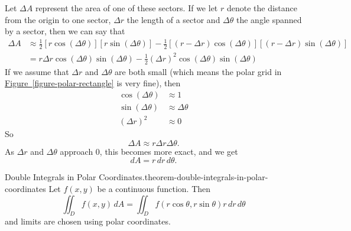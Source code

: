 \documentclass[10pt,]{book}
\numberwithin{equation}{section}
\begin{document}
%
\par
\hypertarget{p-1486}{}%
Let \(\Delta A\) represent the area of one of these sectors. If we let \(r\) denote the distance from the origin to one sector, \(\Delta r\) the length of a sector and \(\Delta\theta\) the angle spanned by a sector, then we can say that%
\begin{align*}
\Delta A & \approx \frac{1}{2}[r\cos(\Delta\theta)][r\sin(\Delta\theta)] - \frac{1}{2}[(r-\Delta r)\cos(\Delta\theta)][(r-\Delta r)\sin(\Delta\theta)] \\
& = r\Delta r\cos(\Delta\theta)\sin(\Delta\theta) - \frac{1}{2}(\Delta r)^{2}\cos(\Delta\theta)\sin(\Delta\theta)
\end{align*}
If we assume that \(\Delta r\) and \(\Delta\theta\) are both small (which means the polar grid in \hyperref[figure-polar-rectangle]{Figure~\ref{figure-polar-rectangle}} is very fine), then%
\begin{align*}
\cos(\Delta\theta) & \approx 1 \\
\sin(\Delta\theta) & \approx \Delta\theta \\
(\Delta r)^{2} & \approx 0 
\end{align*}
So%
\begin{equation*}
\Delta A \approx r\Delta r\Delta\theta\text{.}
\end{equation*}
As \(\Delta r\) and \(\Delta\theta\) approach \(0\), this becomes more exact, and we get%
\begin{equation*}
dA = r\,dr\,d\theta\text{.}
\end{equation*}
%
\begin{theorem}{Double Integrals in Polar Coordinates.}{}{theorem-double-integrals-in-polar-coordinates}%
\hypertarget{p-1487}{}%
Let \(f(x,y)\) be a continuous function. Then%
\begin{equation*}
\iint_{D}f(x,y)\,dA = \iint_{D}f(r\cos\theta,r\sin\theta)r\,dr\,d\theta
\end{equation*}
and limits are chosen using polar coordinates.%
\end{theorem}
\end{document}
